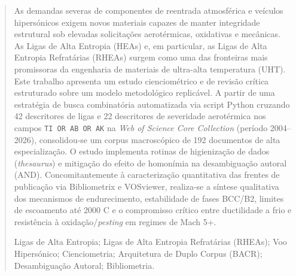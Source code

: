 \renewcommand{\abstractname}{\large\bfseries\color{primary} Resumo}
\begin{abstract}
\noindent As demandas severas de componentes de reentrada atmosférica e veículos hipersónicos exigem novos materiais capazes de manter integridade estrutural sob elevadas solicitações aerotérmicas, oxidativas e mecânicas. As Ligas de Alta Entropia (HEAs) e, em particular, as Ligas de Alta Entropia Refratárias (RHEAs) surgem como uma das fronteiras mais promissoras da engenharia de materiais de ultra-alta temperatura (UHT). Este trabalho apresenta um estudo cienciométrico e de revisão crítica estruturado sobre um modelo metodológico replicável. A partir de uma estratégia de busca combinatória automatizada via script Python cruzando 42 descritores de ligas e 22 descritores de severidade aerotérmica nos campos \texttt{TI OR AB OR AK} na \emph{Web of Science Core Collection} (período 2004--2026), consolidou-se um corpus macroscópico de 192 documentos de alta especialização. O estudo implementa rotinas de higienização de dados (\emph{thesaurus}) e mitigação do efeito de homonímia na desambiguação autoral (AND). Concomitantemente à caracterização quantitativa das frentes de publicação via Bibliometrix e VOSviewer, realiza-se a síntese qualitativa dos mecanismos de endurecimento, estabilidade de fases BCC/B2, limites de escoamento até 2000 \textdegree{}C e o compromisso crítico entre ductilidade a frio e resistência à oxidação/\emph{pesting} em regimes de Mach 5+.

\vspace{0.8em}
 Ligas de Alta Entropia; Ligas de Alta Entropia Refratárias (RHEAs); Voo Hipersónico; Cienciometria; Arquitetura de Duplo Corpus (BACR); Desambiguação Autoral; Bibliometria.
\end{abstract}
